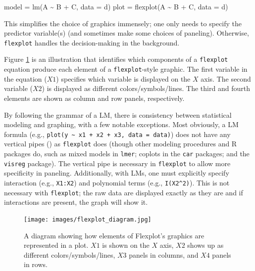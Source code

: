 \documentclass[
  english,
  man]{apa6}
\newenvironment{Shaded}{\begin{snugshade}}{\end{snugshade}}
\newcommand{\AttributeTok}[1]{\textcolor[rgb]{0.77,0.63,0.00}{#1}}
\newcommand{\FunctionTok}[1]{\textcolor[rgb]{0.00,0.00,0.00}{#1}}
\newcommand{\NormalTok}[1]{#1}
\newcommand{\OtherTok}[1]{\textcolor[rgb]{0.56,0.35,0.01}{#1}}
\newcommand{\SpecialCharTok}[1]{\textcolor[rgb]{0.00,0.00,0.00}{#1}}
\begin{document}
\small

\begin{Shaded}
\begin{Highlighting}[]
\NormalTok{model }\OtherTok{=}       \FunctionTok{lm}\NormalTok{(A }\SpecialCharTok{\textasciitilde{}}\NormalTok{ B }\SpecialCharTok{+}\NormalTok{ C, }\AttributeTok{data =}\NormalTok{ d)}
\NormalTok{plot  }\OtherTok{=} \FunctionTok{flexplot}\NormalTok{(A }\SpecialCharTok{\textasciitilde{}}\NormalTok{ B }\SpecialCharTok{+}\NormalTok{ C, }\AttributeTok{data =}\NormalTok{ d)}
\end{Highlighting}
\end{Shaded}

\normalsize

This simplifies the choice of graphics immensely; one only needs to specify the predictor variable(s) (and sometimes make some choices of paneling). Otherwise, \texttt{flexplot} handles the decision-making in the background.

Figure \ref{fig:flexplotgrammar} is an illustration that identifies which components of a \texttt{flexplot} equation produce each element of a \texttt{flexplot}-style graphic. The first variable in the equation (\(X1\)) specifies which variable is displayed on the \(X\) axis. The second variable (\(X2\)) is displayed as different colors/symbols/lines. The third and fourth elements are shown as column and row panels, respectively.

By following the grammar of a LM, there is consistency between statistical modeling and graphing, with a few notable exceptions. Most obviously, a LM formula (e.g., \texttt{plot(y\ \textasciitilde{}\ x1\ +\ x2\ +\ x3,\ data\ =\ data)}) does not have any vertical pipes (\texttt{\textbar{}}) as \texttt{flexplot} does (though other modeling procedures and R packages do, such as mixed models in \texttt{lmer}; coplots in the \texttt{car} packages; and the \texttt{visreg} package). The vertical pipe is necessary in \texttt{flexplot} to allow more specificity in paneling. Additionally, with LMs, one must explicitly specify interaction (e.g., \texttt{X1:X2}) and polynomial terms (e.g., \texttt{I(X2\^{}2)}). This is not necessary with \texttt{flexplot}; the raw data are displayed exactly as they are and if interactions are present, the graph will show it.

\begin{figure}
\centering
\texttt{[image: images/flexplot\_diagram.jpg]}
\caption{A diagram showing how elements of Flexplot's graphics are represented in a plot. $X1$ is shown on the $X$ axis, $X2$ shows up as different colors/symbols/lines, $X3$ panels in columns, and $X4$ panels in rows.}
\label{fig:flexplotgrammar}
\end{figure}
\end{document}

